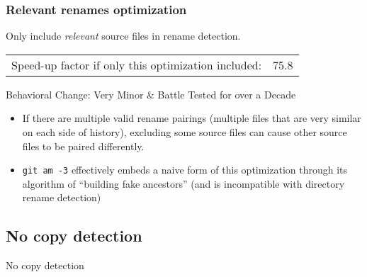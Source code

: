 \documentclass[compress,t]{beamer}
\begin{document}
\begin{frame}
  \frametitle{Relevant renames optimization}

  Only include \textit{relevant} source files in rename detection.

  \pause
  \vspace*{\baselineskip}
  \begin{tabular}{lr}
    Speed-up factor if only this optimization included:  & 75.8 \\
  \end{tabular}

  \vspace*{2\baselineskip}
  \pause
  {\scriptsize
  Behavioral Change: Very Minor \& Battle Tested for over a Decade
  \pause
  \begin{itemize}
    \item If there are multiple valid rename pairings (multiple files that
          are very similar on each side of history), excluding some source
          files can cause other source files to be paired differently.
    \pause
    \item \texttt{git am -3} effectively embeds a naive form of this
          optimization through its algorithm of ``building fake
          ancestors''
          \pause
          (and is incompatible with directory rename detection) \\
          \pause
          \vspace*{\baselineskip}
  \end{itemize}
  }

\end{frame}

\subsection[No Copy]{No copy detection}

\begin{frame}
  \vfill
  \vspace*{2\baselineskip}
  {\Huge
  \begin{center}No copy detection\end{center}
  }
  \vfill
\end{frame}
\end{document}
